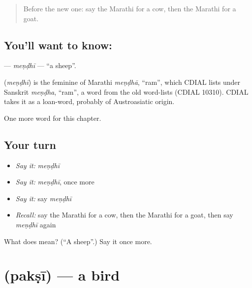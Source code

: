 \label{lesson:MR-C100-mendhi}



\begin{quote}
Before the new one: say the Marathi for a cow, then the Marathi for a goat.
\end{quote}

\subsection*{You'll want to know: }
\textbf{} — \emph{meṇḍhī} — \textquotedblleft{}a sheep\textquotedblright{}.

\begin{cousinweb}
\textbf{} (\emph{meṇḍhī}) is the feminine of Marathi \emph{meṇḍhā}, \textquotedblleft{}ram\textquotedblright{}, which CDIAL lists under Sanskrit \emph{meṇḍha}, \textquotedblleft{}ram\textquotedblright{}, a word from the old word-lists (CDIAL 10310). CDIAL takes it as a loan-word, probably of Austroasiatic origin.
\end{cousinweb}

\begin{grammarlens}[title={What you've built}]
One more word for this chapter.
\end{grammarlens}

\subsection*{Your turn}
\begin{itemize}
\raggedright
  \item \emph{Say it:} \emph{meṇḍhī}
  \item \emph{Say it:} \emph{meṇḍhī}, once more
  \item \emph{Say it:} say \emph{meṇḍhī}
  \item \emph{Recall:} say the Marathi for a cow, then the Marathi for a goat, then say \emph{meṇḍhī} again
\end{itemize}

\begin{tcolorbox}[breakable,colback=teal!4,colframe=teal!35!black,title={Before you move on}]
What does  mean? (\textquotedblleft{}A sheep\textquotedblright{}.) Say it once more.
\end{tcolorbox}
\section[\texorpdfstring{\mr{पक्षी} (pakṣī)}{पक्षी (pakṣī)}]{ (pakṣī) — a bird}

